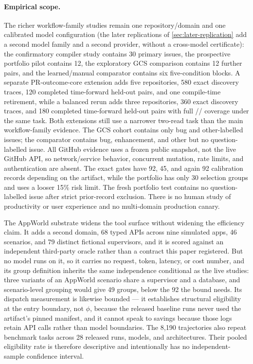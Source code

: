 \paragraph{Empirical scope.}
The richer workflow-family studies remain one repository/domain and one calibrated model
configuration (the later replications of \cref{sec:later-replication} add a second model
family and a second provider, without a cross-model certificate): the confirmatory compiler study contains 30 primary issues, the
prospective portfolio pilot contains 12, the exploratory GCS comparison contains 12
further pairs, and the learned/manual comparator contains six five-condition blocks.  A
separate PR-outcome-core extension adds five repositories, 580 exact discovery traces,
120 completed time-forward held-out pairs, and one compile-time retirement, while a
balanced rerun adds three repositories, 360 exact discovery traces, and 180 completed
time-forward held-out pairs with full //
coverage under the same task.  Both extensions still use a narrower two-read task than
the main workflow-family evidence.  The GCS cohort contains only bug and other-labelled
issues; the comparator contains bug, enhancement, and other but no question-labelled
issue.  All GitHub evidence uses a frozen public snapshot, not the live GitHub API, so
network/service behavior, concurrent mutation, rate limits, and authentication are
absent.  The exact gates have 92, 45, and again 92 calibration records depending on the
artifact, while the portfolio has only 30 selection groups and uses a looser 15\% risk
limit.  The fresh portfolio test contains no question-labelled issue after strict
prior-record exclusion.
There is no human study of
productivity or user experience and no multi-domain production canary.

The AppWorld substrate widens the tool surface without widening the efficiency claim.  It
adds a second domain, 68 typed APIs across nine simulated apps, 46 scenarios, and 79
distinct fictional supervisors, and it is scored against an independent third-party
oracle rather than a contract this paper registered.  But no model runs on it, so it
carries no request, token, latency, or cost number, and its group definition inherits the
same independence conditional as the live studies: three variants of an AppWorld scenario
share a supervisor and a database, and scenario-level grouping would give 49 groups, below
the 92 the bound needs.  Its dispatch measurement is likewise bounded --- it establishes
structural eligibility at the entry boundary, not $\phi$, because the released baseline
runs never used the artifact's pinned manifest, and it cannot speak to savings because
those logs retain API calls rather than model boundaries.
The 8,190 trajectories also repeat benchmark tasks across 28 released runs, models, and
architectures. Their pooled eligibility rate is therefore descriptive and intentionally has
no independent-sample confidence interval.

